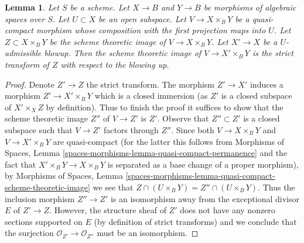 \documentclass[10pt,a4paper]{amsart}
\theoremstyle{plain}
\newtheorem{lemma}[subsection]{Lemma}
\theoremstyle{definition}
\theoremstyle{remark}
\numberwithin{equation}{subsection}
\begin{document}
\begin{lemma}
\label{lemma-replaced-by-strict-transform}
Let $S$ be a scheme. Let $X \to B$ and $Y \to B$ be morphisms of
algebraic spaces over $S$. Let $U \subset X$ be an open subspace.
Let $V \to X \times_B Y$ be a quasi-compact morphism
whose composition with the first projection maps into $U$.
Let $Z \subset X \times_B Y$ be the scheme theoretic image of
$V \to X \times_B Y$. Let $X' \to X$ be a $U$-admissible blowup.
Then the scheme theoretic image of $V \to X' \times_B Y$ is the
strict transform of $Z$ with respect to the blowing up.
\end{lemma}

\begin{proof}
Denote $Z' \to Z$ the strict transform. The morphism $Z' \to X'$
induces a morphism $Z' \to X' \times_B Y$ which is a closed immersion
(as $Z'$ is a closed subspace of $X' \times_X Z$ by definition).
Thus to finish the proof it suffices to show that the scheme theoretic
image $Z''$ of $V \to Z'$ is $Z'$. Observe that $Z'' \subset Z'$
is a closed subspace such that $V \to Z'$ factors through $Z''$.
Since both $V \to X \times_B Y$ and $V \to X' \times_B Y$ are
quasi-compact (for the latter this follows from Morphisms of Spaces, Lemma
\ref{spaces-morphisms-lemma-quasi-compact-permanence}
and the fact that $X' \times_B Y \to X \times_B Y$ is separated
as a base change of a proper morphism), by Morphisms of Spaces, Lemma
\ref{spaces-morphisms-lemma-quasi-compact-scheme-theoretic-image}
we see that $Z \cap (U \times_B Y) = Z'' \cap (U \times_B Y)$.
Thus the inclusion morphism $Z'' \to Z'$ is an isomorphism
away from the exceptional divisor $E$ of $Z' \to Z$. However, the
structure sheaf of $Z'$ does not have any nonzero sections supported
on $E$ (by definition of strict transforms) and we conclude that
the surjection $\mathcal{O}_{Z'} \to \mathcal{O}_{Z''}$ must be an isomorphism.
\end{proof}
\end{document}
